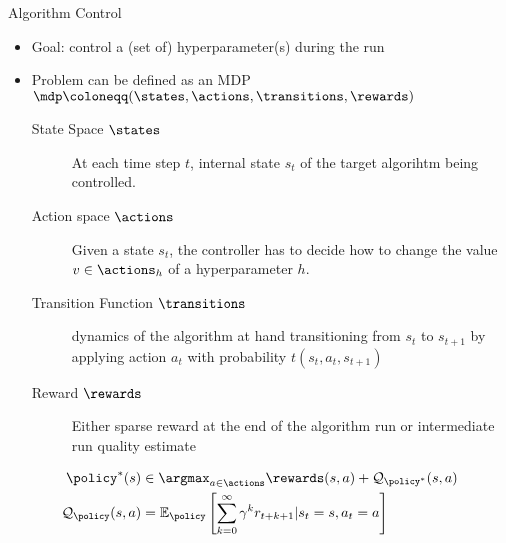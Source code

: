 \begin{frame}[c]{Algorithm Control }

\begin{itemize}
	\item Goal: control a (set of) hyperparameter(s) during the run
	\item Problem can be defined as an MDP $\mdp\coloneqq(\states,\actions,\transitions,\rewards)$
	\begin{description}
		\item[State Space $\states$] At each time step $t$, internal state $s_t$ of the target algorihtm being controlled.
		\item[Action space $\actions$] Given a state $s_t$, the controller has to decide how to change the value $v\in\actions_h$
		of a hyperparameter $h$.
		\item[Transition Function $\transitions$] dynamics of the algorithm at hand transitioning from $s_t$ to $s_{t+1}$ by applying action $a_t$ with probability $t(s_t, a_t, s_{t+1})$
		\item[Reward $\rewards$] Either sparse reward at the end of the algorithm run or intermediate run quality estimate
		
	\end{description}
\end{itemize}

\pause

\vspace*{-0.5cm}            
\begin{align}
\policy^*(s)&\in
\argmax_{a\in\actions} \rewards(s,a)+\mathcal{Q}_{\policy^*}(s,a) \nonumber\\
\mathcal{Q}_{\policy}(s,a)&=
\mathbb{E}_{\policy}\left[\sum_{k=0}^\infty\gamma^k r_{t+k+1}| s_t=s, a_t=a\right]\nonumber
\end{align}

\end{frame}

